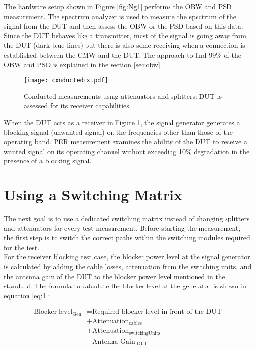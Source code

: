 The hardware setup shown in Figure \ref{fig:Ng1} performs the \acf{OBW} and \acf{PSD} measurement. The spectrum analyzer is used to measure the spectrum of the signal from the \acs{DUT} and then assess the \acf{OBW} or the \acf{PSD} based on this data. Since the \acs{DUT} behaves like a transmitter, most of the signal is going away from the \acs{DUT} (dark blue lines) but there is also some receiving when a connection is established between the \acf{CMW} and the \acs{DUT}. The approach to find 99\% of the \acf{OBW} and \acf{PSD} is explained in the section \ref{sec:obw}.

\begin{figure}[H]
\centering
   \texttt{[image: conductedrx.pdf]}
 \vspace{-1.2cm} \caption{Conducted measurements using attenuators and splitters: \acs{DUT} is assessed for its receiver capabilities}
   \label{fig:Ng2}
\end{figure}

When the \acs{DUT} acts as a receiver in Figure \ref{fig:Ng2}, the signal generator generates a blocking signal (unwanted signal) on the frequencies other than those of the operating band.  \acf{PER} measurement examines the ability of the \acs{DUT} to receive a wanted signal on its operating channel without exceeding 10\% degradation in the presence of a blocking signal. 

\section{Using a Switching Matrix}
\label{sec:switch}
The next goal is to use a dedicated switching matrix instead of changing splitters and attenuators for every test measurement. Before starting the measurement, the first step is to switch the correct paths within the switching modules required for the test. \\

For the receiver blocking test case, the blocker power level at the signal generator is calculated by adding the cable losses, attenuation from the switching units, and the antenna gain of the \acs{DUT} to the blocker power level mentioned in the standard. The formula to calculate the blocker level at the generator is shown in equation \ref{eq:1}:

\begin{equation}
\begin{aligned}
\mbox{Blocker level}_ {\mbox{Gen}}  &= \mbox{Required blocker level in front of the DUT} \\
&+ \mbox{Attenuation}_{\mbox{cables}} \\
&+ \mbox{Attenuation}_{\mbox{switchingUnits}}  \\
&- \mbox{Antenna Gain}_{\mbox{ DUT}}
\label{eq:1}
\end{aligned}
\end{equation}

